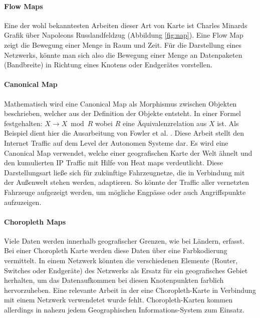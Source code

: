 \documentclass[draft=false
              ,paper=a4
              ,twoside=false
              ,fontsize=11pt
              ,headsepline
              ,BCOR10mm
              ,DIV11
              ]{scrbook}
\begin{document}
\paragraph{Flow Maps} %
\label{par:flow_maps}
Eine der wohl bekanntesten Arbeiten dieser Art von Karte ist Charles Minards Grafik über Napoleons Russlandfeldzug (Abbildung \ref{fig:nap}). Eine Flow Map zeigt die Bewegung einer Menge in Raum und Zeit. Für die Darstellung eines Netzwerks, könnte man sich also die Bewegung einer Menge an Datenpaketen (Bandbreite) in Richtung eines Knotens oder Endgerätes vorstellen. 
\newpage
\paragraph{Canonical Map} %
\label{par:canonical_map}
Mathematisch wird eine Canonical Map als Morphismus zwischen Objekten beschrieben, welcher aus der Definition der Objekte entsteht. In einer Formel festgehalten: $X \rightarrow X \bmod R $ wobei $R$ eine Äquivalenzrelation aus $X$ ist. Als Beispiel dient hier die Ausarbeitung von Fowler et al. \cite{Fowler:2014:IVN:2671491.2671501}. Diese Arbeit stellt den Internet Traffic auf dem Level der Autonomen Systeme dar. Es wird eine Canonical Map verwendet, welche einer geografischen Karte der Welt ähnelt und den kumulierten IP Traffic mit Hilfe von Heat maps verdeutlicht. Diese Darstellungsart ließe sich für zukünftige Fahrzeugnetze, die in Verbindung mit der Außenwelt stehen werden, adaptieren. So könnte der Traffic aller vernetzten Fahrzeuge aufgezeigt werden, um mögliche Engpässe oder auch Angriffspunkte aufzuzeigen.

\paragraph{Choropleth Maps} %
\label{par:choropleth_maps}
Viele Daten werden innerhalb geografischer Grenzen, wie bei Ländern, erfasst. Bei einer Choropleth Karte werden diese Daten über eine Farbkodierung vermittelt. In einem Netzwerk könnten die verschiedenen Elemente (Router, Switches oder Endgeräte) des Netzwerks als Ersatz für ein geografisches Gebiet herhalten, um das Datenaufkommen bei diesen Knotenpunkten farblich hervorzuheben. Eine relevante Arbeit in der eine Choropleth-Karte in Verbindung mit einem Netzwerk verwendetet wurde fehlt. Choropleth-Karten kommen allerdings in nahezu jedem Geographischen Informations-System zum Einsatz.
\end{document}
